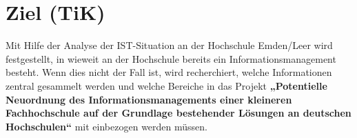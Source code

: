 \section{Ziel (TiK)}
Mit Hilfe der Analyse der IST-Situation an der Hochschule Emden/Leer wird festgestellt, in wieweit an der Hochschule bereits ein Informationsmanagement besteht. Wenn dies nicht der Fall ist, wird recherchiert, welche Informationen zentral gesammelt werden und welche Bereiche in das Projekt \textbf{„Potentielle Neuordnung des Informationsmanagements einer kleineren Fachhochschule auf der Grundlage bestehender Lösungen an deutschen Hochschulen“} mit einbezogen werden müssen.